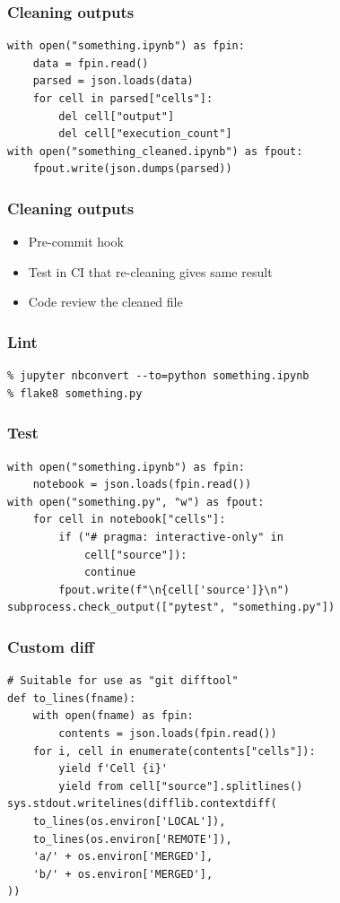 \begin{frame}[fragile]
\frametitle{Cleaning outputs}

\begin{lstlisting}
with open("something.ipynb") as fpin:
    data = fpin.read()
    parsed = json.loads(data)
    for cell in parsed["cells"]:
        del cell["output"]
        del cell["execution_count"]
with open("something_cleaned.ipynb") as fpout:
    fpout.write(json.dumps(parsed))
\end{lstlisting}

\end{frame}

\begin{frame}
\frametitle{Cleaning outputs}

\begin{itemize}
\item Pre-commit hook
\item Test in CI that re-cleaning gives same result
\item Code review the cleaned file
\end{itemize}

\end{frame}


\begin{frame}[fragile]

\frametitle{Lint}

\begin{lstlisting}
% jupyter nbconvert --to=python something.ipynb
% flake8 something.py
\end{lstlisting}

\end{frame}

\begin{frame}[fragile]
\frametitle{Test}

\begin{lstlisting}
with open("something.ipynb") as fpin:
    notebook = json.loads(fpin.read())
with open("something.py", "w") as fpout:
    for cell in notebook["cells"]:
        if ("# pragma: interactive-only" in
            cell["source"]):
            continue
        fpout.write(f"\n{cell['source']}\n")
subprocess.check_output(["pytest", "something.py"])
\end{lstlisting}

\end{frame}


\begin{frame}[fragile]
\frametitle{Custom diff}

\begin{lstlisting}
# Suitable for use as "git difftool"
def to_lines(fname):
    with open(fname) as fpin:
        contents = json.loads(fpin.read())
    for i, cell in enumerate(contents["cells"]):
        yield f'Cell {i}'
        yield from cell["source"].splitlines()
sys.stdout.writelines(difflib.contextdiff(
    to_lines(os.environ['LOCAL']),
    to_lines(os.environ['REMOTE']),
    'a/' + os.environ['MERGED'],
    'b/' + os.environ['MERGED'],
))
\end{lstlisting}


\end{frame}

